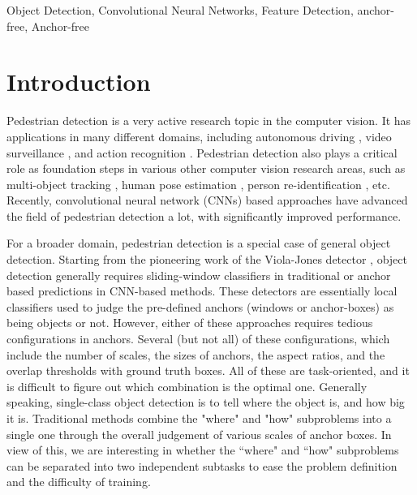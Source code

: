 \documentclass[review]{elsarticle}
\begin{document}
\begin{frontmatter}
\begin{keyword}
Object Detection, Convolutional Neural Networks, Feature Detection, anchor-free, Anchor-free
\end{keyword}

\end{frontmatter}

\section{Introduction}
\label{intro}

Pedestrian detection is a very active research topic in the computer vision. It has applications in many different domains, including autonomous driving \cite{campmany2016gpu}, video surveillance \cite{hattori2015learning}, and action recognition \cite{zhang2020semantics}. Pedestrian detection also plays a critical role as foundation steps in various other computer vision research areas, such as multi-object tracking \cite{huang2019bridging}, human pose estimation \cite{wang2020combining}, person re-identification \cite{
zheng2017person, yan2021anchor}, etc. Recently, convolutional neural network (CNNs) based approaches have advanced the field of pedestrian detection a lot, with significantly improved performance.

For a broader domain, pedestrian detection is a special case of general object detection. Starting from the pioneering work of the Viola-Jones detector \cite{viola2004robust}, object detection generally requires sliding-window classifiers in traditional or anchor based predictions in CNN-based methods. These detectors are essentially local classifiers used to judge the pre-defined anchors (windows or anchor-boxes) as being objects or not. However, either of these approaches requires tedious configurations in anchors. Several (but not all) of these configurations, which include the number of scales, the sizes of anchors, the aspect ratios, and the overlap thresholds with ground truth boxes. All of these are task-oriented, and it is difficult to figure out which combination is the optimal one. Generally speaking, single-class object detection is to tell where the object is, and how big it is. Traditional methods combine the "where" and "how" subproblems into a single one through the overall judgement of various scales of anchor boxes. In view of this, we are interesting in whether the ``where" and ``how" subproblems can be separated into two independent subtasks to ease the problem definition and the difficulty of training.
\end{document}
